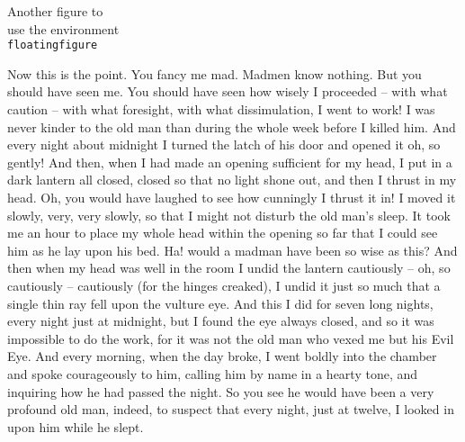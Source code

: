 \documentclass[11pt]{article}
\begin{document}
\begin{floatingfigure}[r]{40mm}
\begin{center}
Another figure to\\ use the environment\\ \texttt{floatingfigure}
\end{center}
\caption{The \texttt{floatingfigure} environment with \texttt{40mm}
for \textit{width} and the \texttt{r} \textit{option}.}
\end{floatingfigure}
Now this is the point. You fancy me mad. Madmen
know nothing. But you should have seen me.
You should have seen how wisely I proceeded --
with what caution -- with what foresight, with what
dissimulation, I went to work! I was never kinder
to the old man than during the whole week before
I killed him. And every night about midnight I
turned the latch of his door and opened it oh, so
gently! And then, when I had made an opening
sufficient for my head, I put in a dark lantern all
closed, closed so that no light shone out, and then
I thrust in my head. Oh, you would have laughed
to see how cunningly I thrust it in! I moved it
slowly, very, very slowly, so that I might not
disturb the old man's sleep. It took me an hour to
place my whole head within the opening so far that
I could see him as he lay upon his bed. Ha! would
a madman have been so wise as this? And then
when my head was well in the room I undid the
lantern cautiously -- oh, so cautiously -- cautiously
(for the hinges creaked), I undid it just so much
that a single thin ray fell upon the vulture eye.
And this I did for seven long nights, every night
just at midnight, but I found the eye always closed,
and so it was impossible to do the work, for it was
not the old man who vexed me but his Evil Eye.
And every morning, when the day broke, I went
boldly into the chamber and spoke courageously to
him, calling him by name in a hearty tone, and
inquiring how he had passed the night. So you see
he would have been a very profound old man, indeed,
to suspect that every night, just at twelve, I
looked in upon him while he slept.
\end{document}
